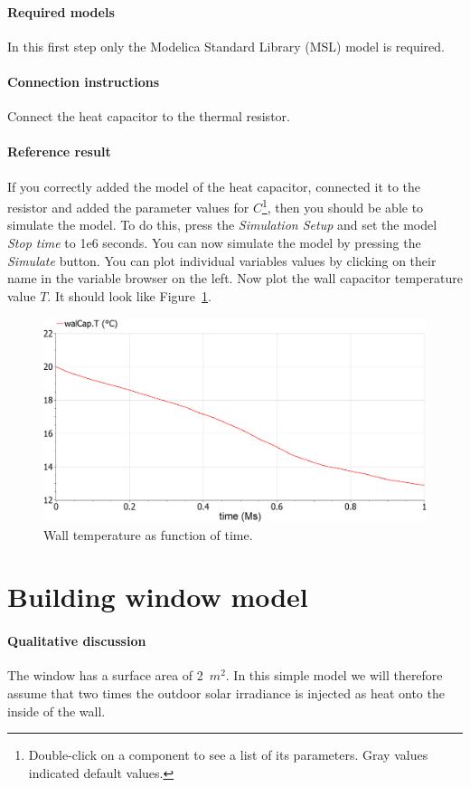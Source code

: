 \documentclass[10pt,a4paper]{article}
\begin{document}
\paragraph{Required models}
In this first step only the Modelica Standard Library (MSL) model  is required.

\paragraph{Connection instructions}
Connect the heat capacitor to the thermal resistor.

\paragraph{Reference result}
If you correctly added the model of the heat capacitor, connected it to the resistor and added the parameter values for $C$\footnote{Double-click on a component to see a list of its parameters. Gray values indicated default values.}, then you should be able to simulate the model. To do this, press the \textit{Simulation Setup} and set the model \textit{Stop time} to 1e6 seconds. You can now simulate the model by pressing the \textit{Simulate} button. You can plot individual variables values by clicking on their name in the variable browser on the left. Now plot the wall capacitor temperature value $T$. It should look like Figure~\ref{fig:res1}.

\begin{figure}[h]
\centering
\includegraphics[width=0.6\columnwidth]{result1.png}
\caption{Wall temperature as function of time.}
\label{fig:res1}
\end{figure}



\newpage
\section{Building window model}
\paragraph{Qualitative discussion}
The window has a surface area of 2~$m^2$. In this simple model we will therefore assume that two times the outdoor solar irradiance is injected as heat onto the inside of the wall.
\end{document}
